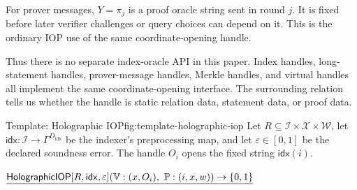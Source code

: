 For prover messages, \(Y=\pi_j\) is a proof oracle string sent in round \(j\).
It is fixed before later verifier challenges or query choices can depend on
it.  This is the ordinary IOP use of the same coordinate-opening handle.

Thus there is no separate index-oracle API in this paper.  Index handles,
long-statement handles, prover-message handles, Merkle handles, and virtual
handles all implement the same coordinate-opening interface.  The surrounding
relation tells us whether the handle is static relation data, statement data,
or proof data.

\begin{protocolbox}{Template: Holographic IOP}{fig:template-holographic-iop}
Let \(R\subseteq\mathcal I\times\mathcal X\times\mathcal W\), let
\(\mathsf{idx}:\mathcal I\to\Gamma^{D_{\mathrm{idx}}}\) be the indexer's
preprocessing map, and let \(\varepsilon\in[0,1]\) be the declared soundness
error.  The handle \(O_i\) opens the fixed string \(\mathsf{idx}(i)\).

\smallskip
\noindent\(\underline{\mathsf{HolographicIOP}[R,\mathsf{idx},\varepsilon](\verifier:(x,O_i),\ \prover:(i,x,w))\to\{0,1\}}\)


\end{protocolbox}
